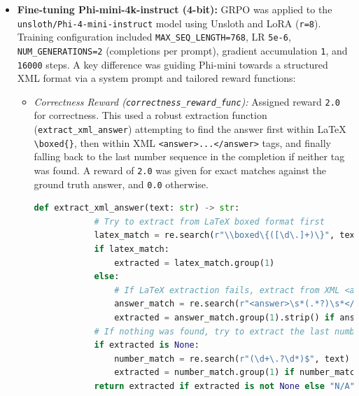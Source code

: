 \documentclass[11pt]{article}
\begin{document}
\begin{itemize}
    \begin{itemize}
    
    \item \textbf{Fine-tuning Phi-mini-4k-instruct (4-bit):}
    GRPO was applied to the \texttt{unsloth/Phi-4-mini-instruct} model using Unsloth and LoRA (\texttt{r=8}). Training configuration included \texttt{MAX\_SEQ\_LENGTH=768}, LR \texttt{5e-6}, \texttt{NUM\_GENERATIONS=2} (completions per prompt), gradient accumulation \texttt{1}, and \texttt{16000} steps. A key difference was guiding Phi-mini towards a structured XML format via a system prompt and tailored reward functions:
    \begin{itemize}
        \item \textit{Correctness Reward (\texttt{correctness\_reward\_func}):} Assigned reward \texttt{2.0} for correctness. This used a robust extraction function (\texttt{extract\_xml\_answer}) attempting to find the answer first within LaTeX \verb|\boxed{}|, then within XML \verb|<answer>...</answer>| tags, and finally falling back to the last number sequence in the completion if neither tag was found. A reward of \texttt{2.0} was given for exact matches against the ground truth answer, and \texttt{0.0} otherwise.
        \begin{lstlisting}[language=Python, caption={Robust answer extraction logic for Phi correctness}, label={lst:phi_extract_updated}]
        def extract_xml_answer(text: str) -> str:
            # Try to extract from LaTeX boxed format first
            latex_match = re.search(r"\\boxed\{([\d\.]+)\}", text)
            if latex_match:
                extracted = latex_match.group(1)
            else:
                # If LaTeX extraction fails, extract from XML <answer> tags
                answer_match = re.search(r"<answer>\s*(.*?)\s*</answer>", text, re.DOTALL)
                extracted = answer_match.group(1).strip() if answer_match else None
            # If nothing was found, try to extract the last number as a fallback
            if extracted is None:
                number_match = re.search(r"(\d+\.?\d*)$", text)
                extracted = number_match.group(1) if number_match else None
            return extracted if extracted is not None else "N/A"
        \end{lstlisting}
        


\end{itemize}
\end{itemize}
\end{itemize}
\end{document}
